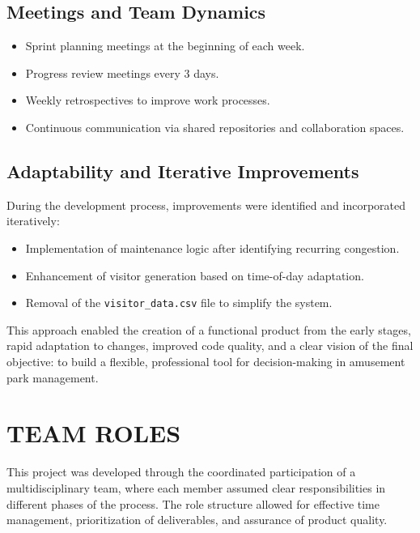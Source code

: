 \documentclass[12pt]{article}
\begin{document}
\subsection{Meetings and Team Dynamics}
\begin{itemize}
\item Sprint planning meetings at the beginning of each week.
\item Progress review meetings every 3 days.
\item Weekly retrospectives to improve work processes.
\item Continuous communication via shared repositories and collaboration spaces.
\end{itemize}

\subsection{Adaptability and Iterative Improvements}

During the development process, improvements were identified and incorporated iteratively:

\begin{itemize}
\item Implementation of maintenance logic after identifying recurring congestion.
\item Enhancement of visitor generation based on time-of-day adaptation.
\item Removal of the \texttt{visitor\_data.csv} file to simplify the system.
\end{itemize}

This approach enabled the creation of a functional product from the early stages, rapid adaptation to changes, improved code quality, and a clear vision of the final objective: to build a flexible, professional tool for decision-making in amusement park management.





\section{TEAM ROLES}
This project was developed through the coordinated participation of a multidisciplinary team, where each member assumed clear responsibilities in different phases of the process. The role structure allowed for effective time management, prioritization of deliverables, and assurance of product quality.
\end{document}
